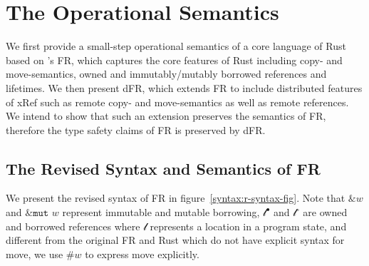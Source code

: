 \section{The Operational Semantics}
\label{chap3:semantics}
We first provide a small-step operational semantics of a core language of Rust based on \citet{10.1145/3443420}'s FR, which captures the core features of Rust including copy- and move-semantics, owned and immutably/mutably borrowed references and lifetimes. We then present dFR, which extends FR to include distributed features of xRef such as remote copy- and move-semantics as well as remote references. We intend to show that such an extension preserves the semantics of FR, therefore the type safety claims of FR is preserved by dFR.

\subsection{The Revised Syntax and Semantics of FR}
\label{semantics:fr}
We present the revised syntax of FR in figure~\ref{syntax:r-syntax-fig}. Note that $\&w$ and $\&\texttt{mut }w$ represent immutable and mutable borrowing, $\mathscr{l}^\bullet$ and $\mathscr{l}^\circ$ are owned and borrowed references where $\mathscr{l}$ represents a location in a program state, and different from the original FR and Rust which do not have explicit syntax for move, we use $\#w$ to express move explicitly.

